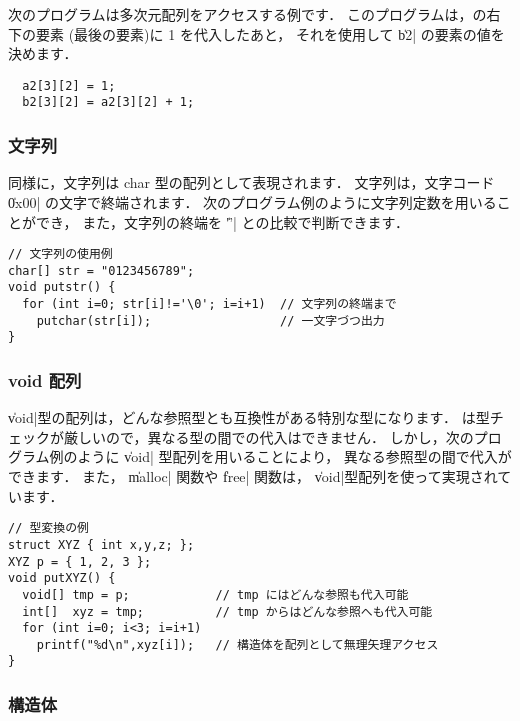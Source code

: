 次のプログラムは多次元配列をアクセスする例です．
このプログラムは，の右下の要素
(最後の要素)に 1 を代入したあと，
それを使用して \|b2| の要素の値を決めます．

\begin{mylist}
\begin{verbatim}
  a2[3][2] = 1;
  b2[3][2] = a2[3][2] + 1;
\end{verbatim}
\end{mylist}

\subsubsection{文字列}

\cl 同様に，文字列は char 型の配列として表現されます．
文字列は，文字コード \|0x00| の文字で終端されます．
次のプログラム例のように文字列定数を用いることができ，
また，文字列の終端を \|'\0'| との比較で判断できます．

\begin{mylist}
\begin{verbatim}
// 文字列の使用例
char[] str = "0123456789";
void putstr() {
  for (int i=0; str[i]!='\0'; i=i+1)  // 文字列の終端まで
    putchar(str[i]);                  // 一文字づつ出力
}
\end{verbatim}
\end{mylist}

\subsubsection{ void 配列}

\|void|型の配列は，どんな参照型とも互換性がある特別な型になります．
\cmml は型チェックが厳しいので，異なる型の間での代入はできません．
しかし，次のプログラム例のように \|void| 型配列を用いることにより，
異なる参照型の間で代入ができます．
また， \|malloc| 関数や \|free| 関数は，
\|void|型配列を使って実現されています．

\begin{mylist}
\begin{verbatim}
// 型変換の例
struct XYZ { int x,y,z; };
XYZ p = { 1, 2, 3 };
void putXYZ() {
  void[] tmp = p;            // tmp にはどんな参照も代入可能
  int[]  xyz = tmp;          // tmp からはどんな参照へも代入可能
  for (int i=0; i<3; i=i+1)
    printf("%d\n",xyz[i]);   // 構造体を配列として無理矢理アクセス
}
\end{verbatim}
\end{mylist}

\subsubsection{構造体}

